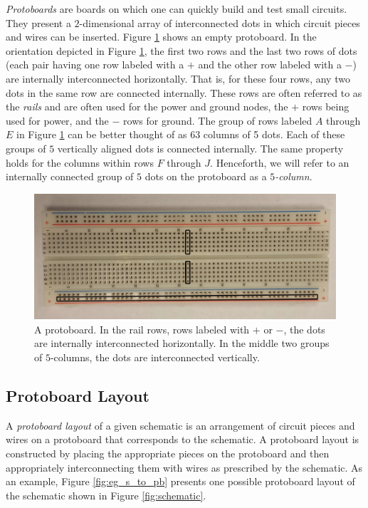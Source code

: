 \textit{Protoboards} are boards on which one can quickly build and test
small circuits. They present a $2$-dimensional array of interconnected dots
in which circuit pieces and wires can be inserted. Figure
\ref{fig:physical_protoboard} shows an empty protoboard.
In the orientation depicted in Figure \ref{fig:physical_protoboard}, the first
two rows and the last two rows of dots (each pair having one row labeled with a
$+$ and the other row labeled with a $-$) are internally interconnected
horizontally. That
is, for these four rows, any two dots in the same row are connected internally.
These rows are often referred to as the \emph{rails} and are often used for the
power and ground nodes, the $+$ rows being used for power, and the $-$ rows for
ground.
The group of rows labeled $A$ through $E$ in Figure \ref{fig:physical_protoboard}
can be better thought of as $63$ columns of 5 dots. Each of these groups of $5$
vertically aligned dots is connected internally.
The same property holds for the columns within
rows $F$ through $J$. Henceforth, we will refer to an internally connected
group of $5$ dots on the protoboard as a \emph{$5$-column}.

\begin{figure}
\begin{center}
\includegraphics[width=\textwidth]{Images/physical_protoboard.jpg}
\caption[Protoboard]{A protoboard. In the rail rows, rows labeled with $+$ or
$-$, the dots are internally interconnected horizontally. In the middle two
groups of $5$-columns, the dots are interconnected vertically.}
\label{fig:physical_protoboard}
\end{center}
\end{figure}

\subsection{Protoboard Layout}
\label{sec:pb_layout}

A \textit{protoboard layout} of a given schematic is an arrangement of
circuit pieces
and wires on a protoboard that corresponds to the schematic. A protoboard layout
is constructed by
placing the appropriate pieces on the protoboard and then appropriately
interconnecting them with wires as prescribed by the schematic. As an example,
Figure \ref{fig:eg_s_to_pb} presents one possible protoboard layout
of the schematic shown in Figure \ref{fig:schematic}.

